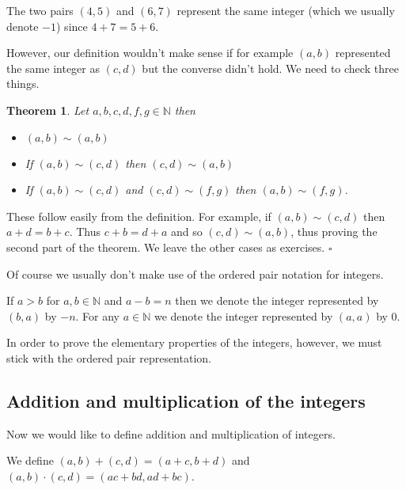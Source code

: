 \documentclass[10pt]{article}
\newcommand{\N}{\mathbb{N}}
\newcommand{\qed}{\square}
\newtheorem{theorem}{Theorem}[section]
\newenvironment{proof}[1][Proof]{\begin{trivlist}
\item[\hskip \labelsep {\bfseries #1}]}{\end{trivlist}}
\newenvironment{definition}[1][Definition]{\begin{trivlist}
\item[\hskip \labelsep {\bfseries #1}]}{\end{trivlist}}
\newenvironment{example}[1][Example]{\begin{trivlist}
\item[\hskip \labelsep {\bfseries #1}]}{\end{trivlist}}
\begin{document}
\begin{example}
The two pairs $(4, 5)$ and $(6, 7)$ represent the same integer (which we usually denote $-1$) since $4 + 7 = 5 + 6$.
\end{example}

However, our definition wouldn't make sense if for example $(a, b)$ represented the same integer as $(c, d)$ but the converse didn't hold. We need to check three things.

\begin{theorem}
Let $a, b, c, d, f, g \in \N$ then
\begin{itemize}
\item $(a, b) \sim (a, b)$
\item If $(a, b) \sim (c, d)$ then $(c, d) \sim (a, b)$
\item If $(a, b) \sim (c, d)$ and $(c, d) \sim (f, g)$ then $(a, b) \sim (f, g)$.
\end{itemize}
\end{theorem}

\begin{proof}
These follow easily from the definition. For example, if $(a, b) \sim (c, d)$ then $a + d = b + c$. Thus $c + b = d + a$ and so $(c, d) \sim (a, b)$, thus proving the second part of the theorem. We leave the other cases as exercises. $\qed$
\end{proof}

Of course we usually don't make use of the ordered pair notation for integers.

\begin{definition}
If $a > b$ for $a, b \in \N$ and $a - b = n$ then we denote the integer represented by $(b, a)$ by $-n$. For any $a \in \N$ we denote the integer represented by $(a, a)$ by $0$.
\end{definition}

In order to prove the elementary properties of the integers, however, we must stick with the ordered pair representation.

\subsection{Addition and multiplication of the integers}

Now we would like to define addition and multiplication of integers.

\begin{definition}
We define $(a, b) + (c, d) = (a + c, b + d)$ and $(a, b)\cdot (c, d) = (ac + bd, ad + bc)$.
\end{definition}
\end{document}
